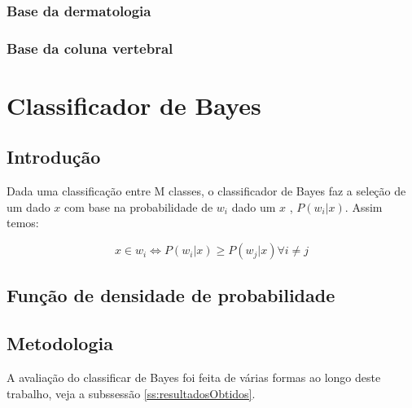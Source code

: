 \documentclass[ 
	article,			%
	11pt,				%
	oneside,			%
	a4paper,			%
	english,			%
	brazil,				%
	]{abntex2}
\begin{document}
 \subsubsection{Base da dermatologia}
 \subsubsection{Base da coluna vertebral}
%  
% 
% 
% 



\section{Classificador de Bayes}

\subsection{Introdução}
Dada uma classificação entre M classes, o classificador de Bayes faz a seleção
de um dado $x$ com base na probabilidade de $w_i$ dado um $x$ , $P(w_i|x)$.
Assim temos:


\begin{equation}
	x \in w_i \iff P(w_i|x) \geq P(w_j|x) \forall i \neq j
\end{equation}

\subsection{Função de densidade de probabilidade}
 
\subsection{Metodologia}
\label{ss:metAplKnn}
A avaliação do classificar de Bayes foi feita de várias formas ao longo deste
trabalho, veja a subssessão \ref{ss:resultadosObtidos}. 
\end{document}
